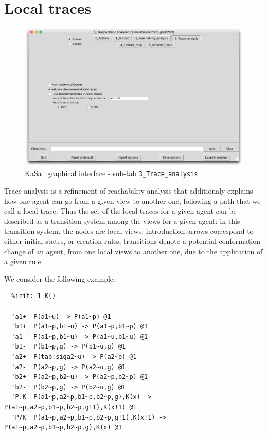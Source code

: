 \documentclass[11pt]{book}
\def\KaSa{\textsf{KaSa}}
\begin{document}
\section{Local traces}
\label{sec:local-traces}


\begin{figure}[htbp]
\centering
\includegraphics[width=12cm,bb=0 0 1904 1208]{img/kasa_3.png}
\caption{\KaSa~ graphical interface - sub-tab \texttt{3\_Trace\_analysis}}
\label{fig:kasa:3}
\end{figure}

Trace analysis is a refinement of reachability analysis that additionaly explains how one agent can go from a given view to another one, following a path that we call a local trace.
Thus the set of the local traces for a given agent can be described as a transition system among the views for a given agent: in this transition system, the nodes are local views; introduction arrows correspond to either initial states, or creation rules; transitions denote a potential conformation change of an agent, from one local views to another one, due to the application of a given rule.

We consider the following example:
\begin{lstlisting}[language=kappa]
  %init: 1 P()
  %init: 1 K()

  'a1+' P(a1~u) -> P(a1~p) @1
  'b1+' P(a1~p,b1~u) -> P(a1~p,b1~p) @1
  'a1-' P(a1~p,b1~u) -> P(a1~u,b1~u) @1
  'b1-' P(b1~p,g) -> P(b1~u,g) @1
  'a2+' P(tab:siga2~u) -> P(a2~p) @1
  'a2-' P(a2~p,g) -> P(a2~u,g) @1
  'b2+' P(a2~p,b2~u) -> P(a2~p,b2~p) @1
  'b2-' P(b2~p,g) -> P(b2~u,g) @1
  'P.K' P(a1~p,a2~p,b1~p,b2~p,g),K(x) -> P(a1~p,a2~p,b1~p,b2~p,g!1),K(x!1) @1
  'P/K' P(a1~p,a2~p,b1~p,b2~p,g!1),K(x!1) -> P(a1~p,a2~p,b1~p,b2~p,g),K(x) @1
\end{lstlisting}
\end{document}
